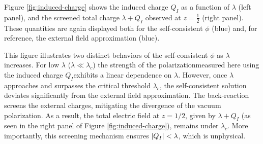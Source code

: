 Figure \ref{fig:induced-charge} shows the induced charge $Q_I$  as a function of $\lambda$ (left panel), and the screened total charge $\lambda + Q_I$ observed at $z=\frac{1}{2}$ (right panel). 
These quantities are again displayed both for the self-consistent $\phi$ (blue) and, for reference, the external field approximation (blue).

This figure illustrates two distinct behaviors of the self-consistent $\phi$ as $\lambda$ increases. For low $\lambda$ ($\lambda \ll \lambda_c$) the strength of the polarization\textemdash  measured here using the induced charge $Q_I$\textemdash exhibits a linear dependence on $\lambda$.
However, once $\lambda$ approaches and surpasses the critical threshold $\lambda_c$, the self-consistent solution deviates significantly from the external field approximation. The back-reaction screens the external charges, mitigating the divergence of the vacuum polarization. As a result, the total electric field at $z=1/2$, given by $\lambda + Q_I$ (as seen in the right panel of Figure \ref{fig:induced-charge}), remains under $\lambda_c$. More importantly, this screening mechanism ensures $\abs{Q_I} < \lambda$, which is unphysical. 



